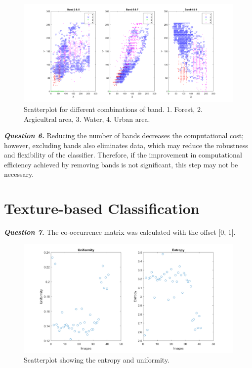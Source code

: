 \documentclass[12pt]{article}
\begin{document}
\begin{figure}[h!]
  \centering
  \includegraphics[width = 15cm]{images/Q5_scatter.png}
  \caption{Scatterplot for different combinations of band. 1. Forest, 2. Argicultral area, 3. Water, 4. Urban area. }
  \label{fig:Q5_scatter}
\end{figure}

\textbf{\emph{Question 6.}}
Reducing the number of bands decreases the computational cost; however, excluding bands also eliminates data, which may reduce the robustness and flexibility of the classifier. Therefore, if the improvement in computational efficiency achieved by removing bands is not significant, this step may not be necessary.
\section{Texture-based Classification}
\textbf{\emph{Question 7.}}
The co-occurrence matrix was calculated with the offset [0, 1].
\begin{figure}[h!]
  \centering
  \includegraphics[width = 15cm]{images/Q7_graph.png}
  \caption{Scatterplot showing the entropy and uniformity.}
  \label{fig:Q7_graph}
\end{figure}
\end{document}
